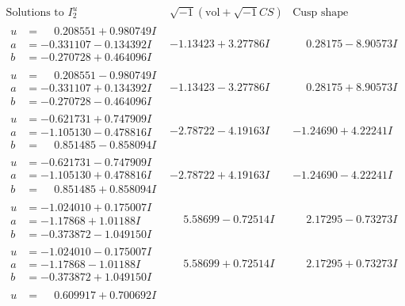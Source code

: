 \documentclass[1p]{elsarticle_modified}
\theoremstyle{definition}
\newcommand{\I}{\sqrt{-1}}
\begin{document}
$$\begin{array}{c|c|c}  
\text{Solutions to }I^u_{2}& \I (\text{vol} + \sqrt{-1}CS) & \text{Cusp shape}\\
 \hline 
\begin{aligned}
u &= \phantom{-}0.208551 + 0.980749 I \\
a &= -0.331107 - 0.134392 I \\
b &= -0.270728 + 0.464096 I\end{aligned}
 & -1.13423 + 3.27786 I & \phantom{-}0.28175 - 8.90573 I \\ \hline\begin{aligned}
u &= \phantom{-}0.208551 - 0.980749 I \\
a &= -0.331107 + 0.134392 I \\
b &= -0.270728 - 0.464096 I\end{aligned}
 & -1.13423 - 3.27786 I & \phantom{-}0.28175 + 8.90573 I \\ \hline\begin{aligned}
u &= -0.621731 + 0.747909 I \\
a &= -1.105130 - 0.478816 I \\
b &= \phantom{-}0.851485 - 0.858094 I\end{aligned}
 & -2.78722 - 4.19163 I & -1.24690 + 4.22241 I \\ \hline\begin{aligned}
u &= -0.621731 - 0.747909 I \\
a &= -1.105130 + 0.478816 I \\
b &= \phantom{-}0.851485 + 0.858094 I\end{aligned}
 & -2.78722 + 4.19163 I & -1.24690 - 4.22241 I \\ \hline\begin{aligned}
u &= -1.024010 + 0.175007 I \\
a &= -1.17868 + 1.01188 I \\
b &= -0.373872 - 1.049150 I\end{aligned}
 & \phantom{-}5.58699 - 0.72514 I & \phantom{-}2.17295 - 0.73273 I \\ \hline\begin{aligned}
u &= -1.024010 - 0.175007 I \\
a &= -1.17868 - 1.01188 I \\
b &= -0.373872 + 1.049150 I\end{aligned}
 & \phantom{-}5.58699 + 0.72514 I & \phantom{-}2.17295 + 0.73273 I \\ \hline\begin{aligned}
u &= \phantom{-}0.609917 + 0.700692 I \\

\end{aligned}
\end{array}$$
\end{document}

